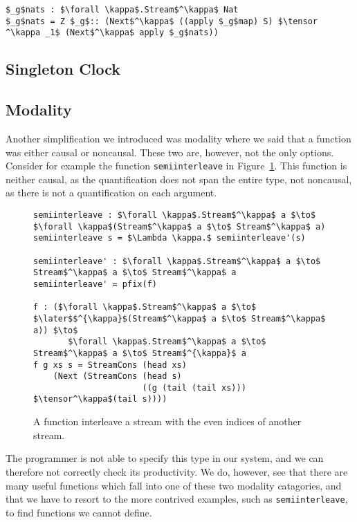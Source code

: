 \begin{lstlisting}[mathescape]
$_g$nats : $\forall \kappa$.Stream$^\kappa$ Nat
$_g$nats = Z $_g$:: (Next$^\kappa$ ((apply $_g$map) S) $\tensor ^\kappa _1$ (Next$^\kappa$ apply $_g$nats))
\end{lstlisting}

\subsection{Singleton Clock}
\label{sec:singleton-clock}
\subsection{Modality}
Another simplification we introduced was modality where we said that a function was
either causal or noncausal. These two are, however, not the only options. Consider
for example the function \texttt{semiinterleave} in
Figure~\ref{fig:semiinterleave}. This function is neither causal, as the
quantification does not span the entire type, not noncausal, as there is not a
quantification on each argument.

\begin{figure}[h]
\begin{lstlisting}[mathescape]
semiinterleave : $\forall \kappa$.Stream$^\kappa$ a $\to$ $\forall \kappa$(Stream$^\kappa$ a $\to$ Stream$^\kappa$ a)
semiinterleave s = $\Lambda \kappa.$ semiinterleave'(s)

semiinterleave' : $\forall \kappa$.Stream$^\kappa$ a $\to$ Stream$^\kappa$ a $\to$ Stream$^\kappa$ a
semiinterleave' = pfix(f)

f : ($\forall \kappa$.Stream$^\kappa$ a $\to$ $\later$$^{\kappa}$(Stream$^\kappa$ a $\to$ Stream$^\kappa$ a)) $\to$ 
       $\forall \kappa$.Stream$^\kappa$ a $\to$ Stream$^\kappa$ a $\to$ Stream$^{\kappa}$ a
f g xs s = StreamCons (head xs)
    (Next (StreamCons (head s) 
                      ((g (tail (tail xs))) $\tensor^\kappa$(tail s))))
\end{lstlisting}
\caption{A function interleave a stream with the even indices of another
  stream.}
\label{fig:semiinterleave}
\end{figure}

The programmer is not able to specify this type in our system, and we can
therefore not correctly check its productivity. We do, however, see that there
are many useful functions which fall into one of these two modality catagories,
and that we have to resort to the more contrived examples, such as
\texttt{semiinterleave}, to find functions we cannot define.

